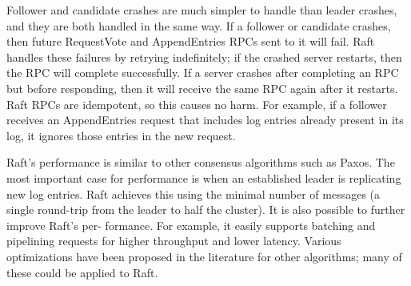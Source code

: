 \documentclass[12pt,letterpaper]{article}
\begin{document}
Follower and candidate crashes are much simpler to handle than leader crashes, and they are both handled in the same way. If a follower or candidate crashes, then future RequestVote and AppendEntries RPCs sent to it will fail. Raft handles these failures by retrying indefinitely; if the crashed server restarts, then the RPC will complete successfully. If a server crashes after completing an RPC but before responding, then it will receive the same RPC again after it restarts. Raft RPCs are idempotent, so this causes no harm. For example, if a follower receives an AppendEntries request that includes log entries already present in its log, it ignores those entries in the new request.

Raft’s performance is similar to other consensus algorithms such as Paxos. The most important case for performance is when an established leader is replicating new log entries. Raft achieves this using the minimal number of messages (a single round-trip from the leader to half the cluster). It is also possible to further improve Raft’s per- formance. For example, it easily supports batching and pipelining requests for higher throughput and lower latency. Various optimizations have been proposed in the literature for other algorithms; many of these could be applied to Raft.
\end{document}
